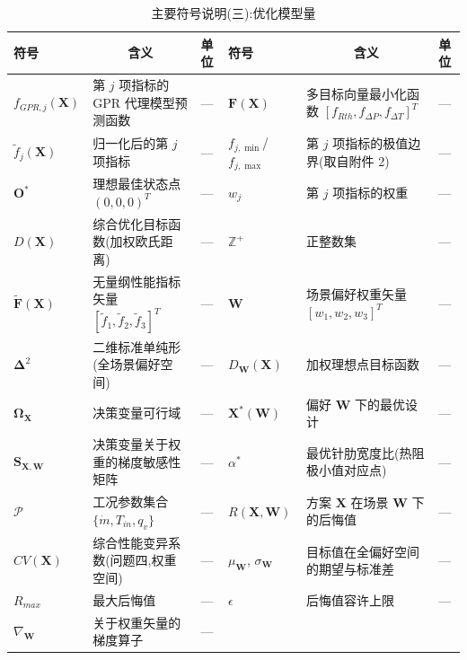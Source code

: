 \begin{table}[H]
\centering
\small
\setlength{\tabcolsep}{2.5pt}
\caption{主要符号说明(三):优化模型量}
\begin{tabular}{>{\centering\arraybackslash}p{1.55cm}p{4.45cm}>{\centering\arraybackslash}p{1.35cm}>{\centering\arraybackslash}p{1.55cm}p{4.45cm}>{\centering\arraybackslash}p{1.35cm}}
\toprule
符号 & \multicolumn{1}{c}{含义} & 单位 & 符号 & \multicolumn{1}{c}{含义} & 单位 \\
\midrule
$f_{GPR,j}(\mathbf{X})$ & 第 $j$ 项指标的 GPR 代理模型预测函数 & — & $\mathbf{F}(\mathbf{X})$ & 多目标向量最小化函数 $[f_{Rth}, f_{\Delta P}, f_{\Delta T}]^T$ & — \\
$\tilde{f}_j(\mathbf{X})$ & 归一化后的第 $j$ 项指标 & — & $f_{j,\min}$/$f_{j,\max}$ & 第 $j$ 项指标的极值边界(取自附件 2) & — \\
$\mathbf{O}^*$  & 理想最佳状态点 $(0,0,0)^T$ & — & $w_j$           & 第 $j$ 项指标的权重 & — \\
$D(\mathbf{X})$ & 综合优化目标函数(加权欧氏距离) & — & $\mathbb{Z}^+$  & 正整数集 & — \\
$\mathbf{\tilde{F}}(\mathbf{X})$ & 无量纲性能指标矢量 $[\tilde{f}_1, \tilde{f}_2, \tilde{f}_3]^T$ & — & $\mathbf{W}$    & 场景偏好权重矢量 $[w_1, w_2, w_3]^T$ & — \\
$\boldsymbol{\Delta}^2$ & 二维标准单纯形(全场景偏好空间) & — & $D_{\mathbf{W}}(\mathbf{X})$ & 加权理想点目标函数 & — \\
$\boldsymbol{\Omega}_{\mathbf{X}}$ & 决策变量可行域 & — & $\mathbf{X}^*(\mathbf{W})$ & 偏好 $\mathbf{W}$ 下的最优设计 & — \\
$\mathbf{S}_{\mathbf{X},\mathbf{W}}$ & 决策变量关于权重的梯度敏感性矩阵 & — & $\alpha^*$      & 最优针肋宽度比(热阻极小值对应点) & — \\
$\mathcal{P}$   & 工况参数集合 $\{\dot{m}, T_{in}, q_v\}$ & — & $R(\mathbf{X}, \mathbf{W})$ & 方案 $\mathbf{X}$ 在场景 $\mathbf{W}$ 下的后悔值 & — \\
$CV(\mathbf{X})$ & 综合性能变异系数(问题四,权重空间) & — & $\mu_{\mathbf{W}}$, $\sigma_{\mathbf{W}}$ & 目标值在全偏好空间的期望与标准差 & — \\
$R_{max}$       & 最大后悔值 & — & $\epsilon$      & 后悔值容许上限 & — \\
$\nabla_{\mathbf{W}}$ & 关于权重矢量的梯度算子 & — & \multicolumn{3}{l}{} \\
\bottomrule
\end{tabular}
\end{table}


